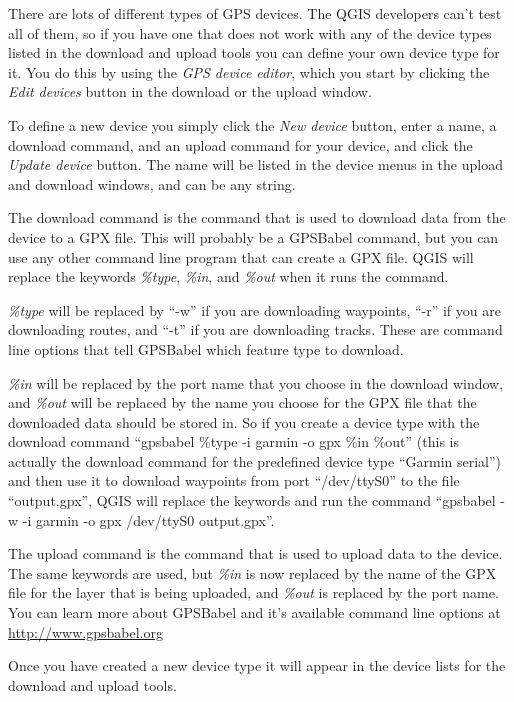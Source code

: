 There are lots of different types of GPS devices. The QGIS developers
can't test all of them, so if you have one that does not work with
any of the device types listed in the download and upload tools you
can define your own device type for it. You do this by using the \emph{GPS
device editor}, which you start by clicking the \emph{Edit devices}
button in the download or the upload window.

To define a new device you simply click the \emph{New device} button,
enter a name, a download command, and an upload command for your device,
and click the \emph{Update device} button. The name will be listed in the
device menus in the upload and download windows, and can be any string. 

The download command is the command that is used to download data
from the device to a GPX file. This will probably be a GPSBabel command,
but you can use any other command line program that can create a GPX
file. QGIS will replace the keywords \emph{\%type}, \emph{\%in}, and
\emph{\%out} when it runs the command.

\emph{\%type} will be replaced by {}``-w'' if you are downloading
waypoints, {}``-r'' if you are downloading routes, and {}``-t''
if you are downloading tracks. These are command line options that
tell GPSBabel which feature type to download. 

\emph{\%in} will be replaced by the port name that you choose in the
download window, and \emph{\%out} will be replaced by the name you
choose for the GPX file that the downloaded data should be stored
in. So if you create a device type with the download command {}``gpsbabel
\%type -i garmin -o gpx \%in \%out'' (this is actually the download
command for the predefined device type {}``Garmin serial'') and
then use it to download waypoints from port {}``/dev/ttyS0'' to
the file {}``output.gpx'', QGIS will replace the keywords and run
the command {}``gpsbabel -w -i garmin -o gpx /dev/ttyS0 output.gpx''.

The upload command is the command that is used to upload data to the
device. The same keywords are used, but \emph{\%in} is now replaced
by the name of the GPX file for the layer that is being uploaded,
and \emph{\%out} is replaced by the port name. You can learn more
about GPSBabel and it's available command line options at
\url{http://www.gpsbabel.org}

Once you have created a new device type it will appear in the device
lists for the download and upload tools.

